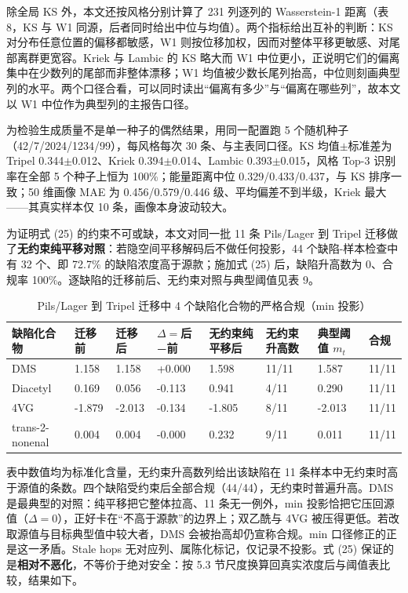 \documentclass[zihao=-4,a4paper,UTF8,fontset=none]{ctexart}
\begin{document}
除全局 KS 外，本文还按风格分别计算了 231 列逐列的 Wasserstein-1 距离（表 8，KS 与 W1 同源，后者同时给出中位与均值）。两个指标给出互补的判断：KS 对分布任意位置的偏移都敏感，W1 则按位移加权，因而对整体平移更敏感、对尾部离群更宽容。Kriek 与 Lambic 的 KS 略大而 W1 中位更小，正说明它们的偏离集中在少数列的尾部而非整体漂移；W1 均值被少数长尾列抬高，中位则刻画典型列的水平。两个口径合看，可以同时读出“偏离有多少”与“偏离在哪些列”，故本文以 W1 中位作为典型列的主报告口径。

为检验生成质量不是单一种子的偶然结果，用同一配置跑 5 个随机种子（42/\allowbreak{}7/\allowbreak{}2024/\allowbreak{}1234/\allowbreak{}99），每风格每次 30 条、与主表同口径。KS 均值$\pm$标准差为 Tripel 0.344$\pm$0.012、Kriek 0.394$\pm$0.014、Lambic 0.393$\pm$0.015，风格 Top-3 识别率在全部 5 个种子上恒为 100\%；能量距离中位 0.329/0.433/0.437，与 KS 排序一致；50 维画像 MAE 为 0.456/0.579/0.446 级、平均偏差不到半级，Kriek 最大——其真实样本仅 10 条，画像本身波动较大。

为证明式 (25) 的约束不可或缺，本文对同一批 11 条 Pils/Lager 到 Tripel 迁移做了\textbf{无约束纯平移对照}：若隐空间平移解码后不做任何投影，44 个缺陷-样本检查中有 32 个、即 72.7\% 的缺陷浓度高于源款；施加式 (25) 后，缺陷升高数为 0、合规率 100\%。逐缺陷的迁移前后、无约束对照与典型阈值见表 9。

\begin{table}[H]
\begin{threeparttable}
\centering
\footnotesize
\caption{Pils/Lager 到 Tripel 迁移中 4 个缺陷化合物的严格合规（min 投影）}
\begin{tabularx}{\textwidth}{@{}LLLLLLLL@{}}
\toprule
\textbf{缺陷化合物} & \textbf{迁移前} & \textbf{迁移后} & \textbf{$\Delta=$后−前} & \textbf{无约束纯平移后} & \textbf{无约束升高数} & \textbf{典型阈值 $m_t$} & \textbf{合规} \\ \midrule
DMS & 1.158 & 1.158 & +0.000 & 1.598 & 11/11 & 1.587 & 11/11 \\
Diacetyl & 0.169 & 0.056 & -0.113 & 0.941 & 4/11 & 0.290 & 11/11 \\
4VG & -1.879 & -2.013 & -0.134 & -1.805 & 8/11 & -2.013 & 11/11 \\
trans-2-nonenal & 0.004 & 0.004 & -0.000 & 0.232 & 9/11 & 0.011 & 11/11 \\
\bottomrule
\end{tabularx}
\end{threeparttable}
\end{table}

表中数值均为标准化含量，无约束升高数列给出该缺陷在 11 条样本中无约束时高于源值的条数。四个缺陷受约束后全部合规（44/44），无约束时普遍升高。DMS 是最典型的对照：纯平移把它整体拉高、11 条无一例外，min 投影恰把它压回源值（$\Delta=0$），正好卡在“不高于源款”的边界上；双乙酰与 4VG 被压得更低。若改取源值与目标典型值中较大者，DMS 会被抬高却仍宣称合规。min 口径修正的正是这一矛盾。Stale hops 无对应列、属陈化标记，仅记录不投影。式 (25) 保证的是\textbf{相对不恶化}，不等价于绝对安全：按 5.3 节尺度换算回真实浓度后与阈值表比较，结果如下。
\end{document}

